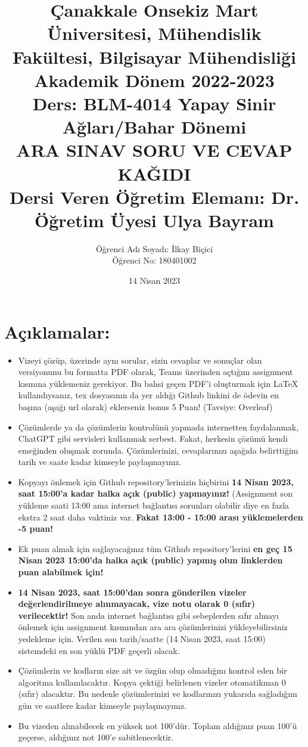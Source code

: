 \documentclass[11pt]{article}
\title{Çanakkale Onsekiz Mart Üniversitesi, Mühendislik Fakültesi, Bilgisayar Mühendisliği Akademik Dönem 2022-2023\\
Ders: BLM-4014 Yapay Sinir Ağları/Bahar Dönemi\\ 
ARA SINAV SORU VE CEVAP KAĞIDI\\
Dersi Veren Öğretim Elemanı: Dr. Öğretim Üyesi Ulya Bayram}
\author{%
\begin{minipage}{\textwidth}
\raggedright
Öğrenci Adı Soyadı: İlkay Biçici\\ %
Öğrenci No: 180401002
\end{minipage}%
}
\date{14 Nisan 2023}
\begin{document}
\maketitle

\vspace{-.5in}
\section*{Açıklamalar:}
\begin{itemize}
    \item Vizeyi çözüp, üzerinde aynı sorular, sizin cevaplar ve sonuçlar olan versiyonunu bu formatta PDF olarak, Teams üzerinden açtığım assignment kısmına yüklemeniz gerekiyor. Bu bahsi geçen PDF'i oluşturmak için LaTeX kullandıysanız, tex dosyasının da yer aldığı Github linkini de ödevin en başına (aşağı url olarak) eklerseniz bonus 5 Puan! (Tavsiye: Overleaf)
    \item Çözümlerde ya da çözümlerin kontrolünü yapmada internetten faydalanmak, ChatGPT gibi servisleri kullanmak serbest. Fakat, herkesin çözümü kendi emeğinden oluşmak zorunda. Çözümlerinizi, cevaplarınızı aşağıda belirttiğim tarih ve saate kadar kimseyle paylaşmayınız. 
    \item Kopyayı önlemek için Github repository'lerinizin hiçbirini \textbf{14 Nisan 2023, saat 15:00'a kadar halka açık (public) yapmayınız!} (Assignment son yükleme saati 13:00 ama internet bağlantısı sorunları olabilir diye en fazla ekstra 2 saat daha vaktiniz var. \textbf{Fakat 13:00 - 15:00 arası yüklemelerden -5 puan!}
    \item Ek puan almak için sağlayacağınız tüm Github repository'lerini \textbf{en geç 15 Nisan 2023 15:00'da halka açık (public) yapmış olun linklerden puan alabilmek için!}
    \item \textbf{14 Nisan 2023, saat 15:00'dan sonra gönderilen vizeler değerlendirilmeye alınmayacak, vize notu olarak 0 (sıfır) verilecektir!} Son anda internet bağlantısı gibi sebeplerden sıfır almayı önlemek için assignment kısmından ara ara çözümlerinizi yükleyebilirsiniz yedekleme için. Verilen son tarih/saatte (14 Nisan 2023, saat 15:00) sistemdeki en son yüklü PDF geçerli olacak.
    \item Çözümlerin ve kodların size ait ve özgün olup olmadığını kontrol eden bir algoritma kullanılacaktır. Kopya çektiği belirlenen vizeler otomatikman 0 (sıfır) alacaktır. Bu nedenle çözümlerinizi ve kodlarınızı yukarıda sağladığım gün ve saatlere kadar kimseyle paylaşmayınız.
    \item Bu vizeden alınabilecek en yüksek not 100'dür. Toplam aldığınız puan 100'ü geçerse, aldığınız not 100'e sabitlenecektir.

\end{itemize}
\end{document}
